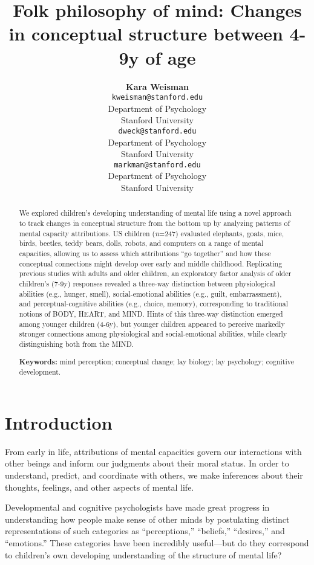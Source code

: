 \documentclass[10pt, letterpaper]{article}
\title{Folk philosophy of mind: Changes in conceptual structure between 4-9y of
age}
\author{{\large \bf Kara Weisman} \\ \texttt{kweisman@stanford.edu} \\ Department of Psychology \\ Stanford University \And {\large \bf Carol S. Dweck} \\ \texttt{dweck@stanford.edu} \\ Department of Psychology \\ Stanford University \And {\large \bf Ellen M. Markman} \\ \texttt{markman@stanford.edu} \\ Department of Psychology \\ Stanford University}
\begin{document}
\maketitle

\begin{abstract}
We explored children's developing understanding of mental life using a
novel approach to track changes in conceptual structure from the bottom
up by analyzing patterns of mental capacity attributions. US children
(\emph{n}=247) evaluated elephants, goats, mice, birds, beetles, teddy
bears, dolls, robots, and computers on a range of mental capacities,
allowing us to assess which attributions ``go together'' and how these
conceptual connections might develop over early and middle childhood.
Replicating previous studies with adults and older children, an
exploratory factor analysis of older children's (7-9y) responses
revealed a three-way distinction between physiological abilities (e.g.,
hunger, smell), social-emotional abilities (e.g., guilt, embarrassment),
and perceptual-cognitive abilities (e.g., choice, memory), corresponding
to traditional notions of BODY, HEART, and MIND. Hints of this three-way
distinction emerged among younger children (4-6y), but younger children
appeared to perceive markedly stronger connections among physiological
and social-emotional abilities, while clearly distinguishing both from
the MIND.

\textbf{Keywords:}
mind perception; conceptual change; lay biology; lay psychology;
cognitive development.
\end{abstract}

\section{Introduction}\label{introduction}

From early in life, attributions of mental capacities govern our
interactions with other beings and inform our judgments about their
moral status. In order to understand, predict, and coordinate with
others, we make inferences about their thoughts, feelings, and other
aspects of mental life.

Developmental and cognitive psychologists have made great progress in
understanding how people make sense of other minds by postulating
distinct representations of such categories as ``perceptions,''
``beliefs,'' ``desires,'' and ``emotions.'' These categories have been
incredibly useful---but do they correspond to children's own developing
understanding of the structure of mental life?
\end{document}
